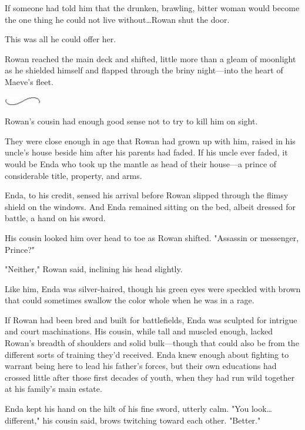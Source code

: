 If someone had told him that the drunken, brawling, bitter woman would become the one thing he could not live without\ldots Rowan shut the door.

This was all he could offer her.

Rowan reached the main deck and shifted, little more than a gleam of moonlight as he shielded himself and flapped through the briny night---into the heart of Maeve's fleet.

\begin{center}
	\includegraphics[width=0.65in,height=0.13in]{images/seperator}
\end{center}

Rowan's cousin had enough good sense not to try to kill him on sight.

They were close enough in age that Rowan had grown up with him, raised in his uncle's house beside him after his parents had faded.
If his uncle ever faded, it would be Enda who took up the mantle as head of their house---a prince of considerable title, property, and arms.

Enda, to his credit, sensed his arrival before Rowan slipped through the flimsy shield on the windows.
And Enda remained sitting on the bed, albeit dressed for battle, a hand on his sword.

His cousin looked him over head to toe as Rowan shifted.
"Assassin or messenger, Prince?"

"Neither," Rowan said, inclining his head slightly.

Like him, Enda was silver-haired, though his green eyes were speckled with brown that could sometimes swallow the color whole when he was in a rage.

If Rowan had been bred and built for battlefields, Enda was sculpted for intrigue and court machinations.
His cousin, while tall and muscled enough, lacked Rowan's breadth of shoulders and solid bulk---though that could also be from the different sorts of training they'd received.
Enda knew enough about fighting to warrant being here to lead his father's forces, but their own educations had crossed little after those first decades of youth, when they had run wild together at his family's main estate.

Enda kept his hand on the hilt of his fine sword, utterly calm.
"You look\ldots different," his cousin said, brows twitching toward each other.
"Better."

